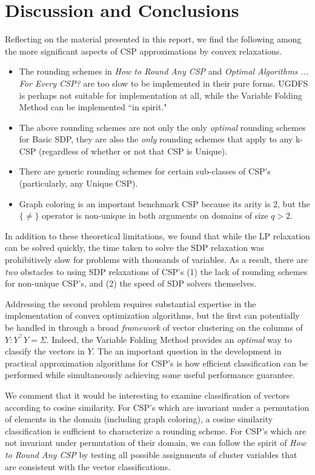 \section{Discussion and Conclusions}	
	Reflecting on the material presented in this report, we find the following among the more significant aspects of CSP approximations by convex relaxations.
\begin{itemize}
\item The rounding schemes in \textit{How to Round Any CSP} and \textit{Optimal Algorithms ... For Every CSP?} are too slow to be implemented in their pure forms. UGDFS is perhaps not suitable for implementation at all, while the Variable Folding Method can be implemented ``in spirit."
\item The above rounding schemes are not only the only \textit{optimal} rounding schemes for Basic SDP, they are also the \textit{only} rounding schemes that apply to any k-CSP (regardless of whether or not that CSP is Unique).
\item There are generic rounding schemes for certain sub-classes of CSP's (particularly, any Unique CSP).
\item Graph coloring is an important benchmark CSP because its arity is 2, but the $\{\neq\}$ operator is non-unique in both arguments on domains of size $q > 2$. 
\end{itemize}
	
	In addition to these theoretical limitations, we found that while the LP relaxation can be solved quickly, the time taken to solve the SDP relaxation was prohibitively slow for problems with thousands of variables. As a result, there are \textit{two} obstacles to using SDP relaxations of CSP's (1) the lack of rounding schemes for non-unique CSP's, and (2) the speed of SDP solvers themselves.
	
	Addressing the second problem requires substantial expertise in the implementation of convex optimization algorithms, but the first can potentially be handled in through a broad \textit{framework} of vector clustering on the columns of $Y : Y^\intercal Y = \Sigma$. Indeed, the Variable Folding Method provides an \textit{optimal} way to classify the vectors in $Y$. The an important question in the development in practical approximation algorithms for CSP's is how efficient classification can be performed while simultaneously achieving some useful performance guarantee.
	
	We comment that it would be interesting to examine classification of vectors according to cosine similarity. For CSP's which are invariant under a permutation of elements in the domain (including graph coloring), a cosine similarity classification is sufficient to characterize a rounding scheme. For CSP's which are not invariant under permutation of their domain, we can follow the spirit of \textit{How to Round Any CSP} by testing all possible assignments of cluster variables that are consistent with the vector classifications.
	
